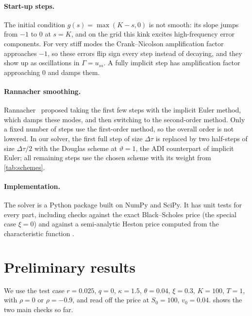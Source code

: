 \documentclass[11pt]{article}
\begin{document}
\paragraph{Start-up steps.}
The initial condition $g(s)=\max(K-s,0)$ is not smooth: its slope jumps from $-1$ to $0$ at $s=K$, and
on the grid this kink excites high-frequency error components. For very stiff modes the Crank--Nicolson
amplification factor approaches $-1$, so these errors flip sign every step instead of decaying, and they show up
as oscillations in $\Gamma=u_{ss}$. A fully implicit step has amplification factor approaching $0$ and damps
them.

\paragraph{Rannacher smoothing.}
Rannacher~\cite{rannacher1984} proposed taking the first few steps with the implicit Euler method, which damps
these modes, and then switching to the second-order method. Only a fixed number of steps use the first-order
method, so the overall order is not lowered. In our solver, the first full step of size $\Delta\tau$ is
replaced by two half-steps of size $\Delta\tau/2$ with the Douglas scheme at $\vartheta=1$, the ADI counterpart
of implicit Euler; all remaining steps use the chosen scheme with its weight from \cref{tab:schemes}.

\paragraph{Implementation.}
The solver is a Python package built on NumPy and SciPy. It has unit tests for every part, including checks
against the exact Black--Scholes price (the special case $\xi=0$) and against a semi-analytic Heston price
computed from the characteristic function \cite{heston1993}.

\section{Preliminary results}
We use the test case $r=0.025$, $q=0$, $\kappa=1.5$, $\theta=0.04$, $\xi=0.3$, $K=100$, $T=1$, with $\rho=0$ or
$\rho=-0.9$, and read off the price at $S_0=100$, $v_0=0.04$.  shows the two main checks so far.
\end{document}
